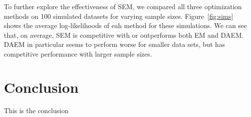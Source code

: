 \documentclass{article}
\theoremstyle{definition}
\theoremstyle{algodesc}
\begin{document}
To further explore the effectiveness of SEM, we compared all three optimization methods on 100 simulated datasets for varying sample sizes. Figure~\ref{fig:sims} shows the average log-likelihoods of eah method for these simulations. We can see that, on average, SEM is competitive with or outperforms both EM and DAEM. DAEM in particular seems to perform worse for smaller data sets, but has competitive performance with larger sample sizes.


\section{Conclusion} \label{sec:conclusion}

This is the conclusion




\end{document}

